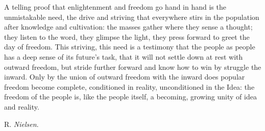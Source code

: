 \documentclass[12pt,a4paper,openany]{book}
\newcommand{\opage}[1]{\marginnote{\footnotesize\textit{[#1]}}}
\newcommand{\signature}[1]{\par\smallskip\hfill #1\hspace*{2em}\par}
\begin{document}
A telling proof that enlightenment and freedom go hand
in hand is the unmistakable need, the drive and striving
that everywhere stirs in the population after knowledge
and cultivation: the masses gather where they sense a thought;
they listen to the word, they glimpse the light, they press forward
to greet the day of freedom. This striving, this need
is a testimony that the people as people has a deep
\setcounter{footnote}{0}%
\opage{39}sense of its future's task, that it will not
settle down at rest with outward freedom, but stride
further forward and know how to win by struggle the inward.
Only by the union of outward freedom with the inward
does popular freedom become complete, conditioned in
reality, unconditioned in the Idea: the freedom of the people is, like
the people itself, a becoming, growing unity of idea and
reality.
\signature{R. \emph{Nielsen}.}
\end{document}
